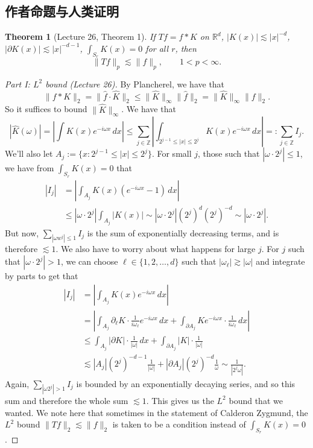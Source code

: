 \documentclass[UTF8,11pt]{ctexart}
\newtheorem*{theorem}{Theorem}
\theoremstyle{definition}
\newcommand{\R}{\mathbb R}
\newcommand{\Z}{\mathbb Z}
\begin{document}
\subsection*{作者命题与人类证明}
\begin{theorem}[Lecture 26, Theorem 1]
If $Tf=f*K$ on $\R^d$, $|K(x)|\lesssim |x|^{-d}$, $|\partial K(x)|\lesssim |x|^{-d-1}$, $\int_{S_r}K(x)=0$ for all $r$, then
\[\|Tf\|_p\lesssim\|f\|_p,\qquad 1<p<\infty.\]
\end{theorem}
\begin{proof}[Part I: $L^2$ bound (Lecture 26)]
By Plancherel, we have that
\[\|f*K\|_2=\|\widehat f\cdot\widehat K\|_2\leq\|\widehat K\|_\infty\|\widehat f\|_2=\|\widehat K\|_\infty\|f\|_2.\]
So it suffices to bound $\|\widehat K\|_\infty$. We have that
\[|\widehat K(\omega)|=\left|\int K(x)e^{-i\omega x}\,dx\right|\leq\sum_{j\in\Z}\left|\int_{2^{j-1}\leq|x|\leq2^j}K(x)e^{-i\omega x}\,dx\right|=:\sum_{j\in\Z}I_j.\]
We'll also let $A_j:=\{x:2^{j-1}\leq|x|\leq2^j\}$. For small $j$, those such that $|\omega\cdot2^j|\leq1$, we have from $\int_{S_r}K(x)=0$ that
\begin{align*}
|I_j|&=\left|\int_{A_j}K(x)(e^{-i\omega x}-1)\,dx\right|\\
&\leq|\omega\cdot2^j|\int_{A_j}|K(x)|\sim|\omega\cdot2^j|(2^j)^d(2^j)^{-d}\sim|\omega\cdot2^j|.
\end{align*}
But now, $\sum_{|\omega w^j|\leq1}I_j$ is the sum of exponentially decreasing terms, and is therefore $\lesssim1$. We also have to worry about what happens for large $j$. For $j$ such that $|\omega\cdot2^j|>1$, we can choose $\ell\in\{1,2,\ldots,d\}$ such that $|\omega_\ell|\gtrsim|\omega|$ and integrate by parts to get that
\begin{align*}
|I_j|&=\left|\int_{A_j}K(x)e^{-i\omega x}\,dx\right|\\
&=\left|\int_{A_j}\partial_\ell K\cdot\frac1{i\omega_\ell}e^{-i\omega x}\,dx+\int_{\partial A_j}Ke^{-i\omega x}\cdot\frac1{i\omega_\ell}\,dx\right|\\
&\leq\int_{A_j}|\partial K|\cdot\frac1{|\omega|}\,dx+\int_{\partial A_j}|K|\cdot\frac1{|\omega|}\\
&\lesssim|A_j|(2^j)^{-d-1}\frac1{|\omega|}+|\partial A_j|(2^j)^{-d}\frac1\omega
\sim\frac1{|2^j\omega|}.
\end{align*}
Again, $\sum_{|\omega2^j|>1}I_j$ is bounded by an exponentially decaying series, and so this sum and therefore the whole sum $\lesssim1$. This gives us the $L^2$ bound that we wanted. We note here that sometimes in the statement of Calderon Zygmund, the $L^2$ bound $\|Tf\|_2\lesssim\|f\|_2$ is taken to be a condition instead of $\int_{S_r}K(x)=0$.
\end{proof}
\end{document}
